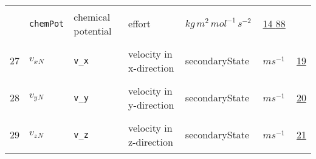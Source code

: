 \begin{longtable}{|p{1cm}|p{2.5cm}|p{4.5cm}|p{8cm}|p{3.0cm}|p{3cm}|p{1cm}|}
             & \verb|chemPot|
             & chemical potential
             & \begin{lay}effort \end{lay}
             & $ kg \,m^{2} \,mol^{-1} \,s^{-2} \, $
             &                 \hyperlink{"e:14"}{ 14 }
                                 \hyperlink{"e:88"}{ 88 }
                 \\
            27
             & \hypertarget{"v:27"}{ $ {{v_x}}{_{N}} $}
             & \verb|v_x|
             & velocity in x-direction
             & \begin{lay}secondaryState \end{lay}
             & $ m s^{-1} \, $
             &                 \hyperlink{"e:19"}{ 19 }
                 \\
            28
             & \hypertarget{"v:28"}{ $ {{v_y}}{_{N}} $}
             & \verb|v_y|
             & velocity in y-direction
             & \begin{lay}secondaryState \end{lay}
             & $ m s^{-1} \, $
             &                 \hyperlink{"e:20"}{ 20 }
                 \\
            29
             & \hypertarget{"v:29"}{ $ {{v_z}}{_{N}} $}
             & \verb|v_z|
             & velocity in z-direction
             & \begin{lay}secondaryState \end{lay}
             & $ m s^{-1} \, $
             &                 \hyperlink{"e:21"}{ 21 }
                 \\
    \end{longtable}